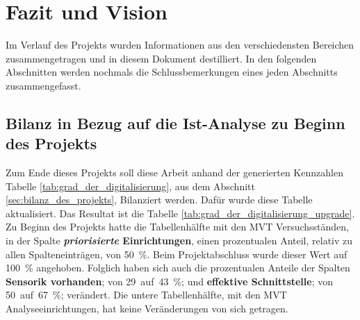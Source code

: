 \section{Fazit und Vision}

Im Verlauf des Projekts wurden Informationen aus den verschiedensten Bereichen zusammengetragen und in diesem Dokument destilliert. In den folgenden Abschnitten werden nochmals die Schlussbemerkungen eines jeden Abschnitts zusammengefasst.	 

\subsection{Bilanz in Bezug auf die Ist-Analyse zu Beginn des Projekts}

Zum Ende dieses Projekts soll diese Arbeit anhand der generierten Kennzahlen Tabelle \ref{tab:grad_der_digitalisierung}, aus dem Abschnitt \ref{sec:bilanz_des_projekts}, Bilanziert werden. Dafür wurde diese Tabelle aktualisiert. Das Resultat ist die Tabelle \ref{tab:grad_der_digitalisierung_upgrade}. Zu Beginn des Projekts hatte die Tabellenhälfte mit den MVT Versuchsständen, in der Spalte  \textbf{\textit{priorisierte} Einrichtungen}, einen prozentualen Anteil, relativ zu allen Spalteneinträgen, von 50~\%. Beim Projektabschluss wurde dieser Wert auf 100~\% angehoben. Folglich haben sich auch die prozentualen Anteile der Spalten \textbf{Sensorik vorhanden}; von 29~auf~43~\%; und \glqq \textbf{effektive Schnittstelle}\grqq; von 50~auf~67~\%; verändert. Die untere Tabellenhälfte, mit den MVT Analyseeinrichtungen, hat keine Veränderungen von sich getragen. \\






